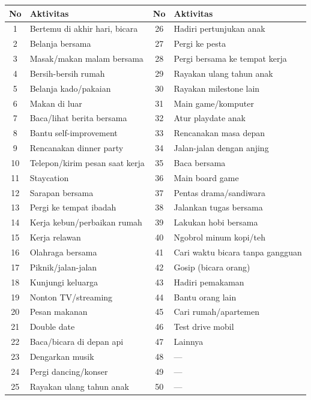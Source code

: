 \begin{center}
\small
\renewcommand{\arraystretch}{1.2}
\begin{tabular}{|c|l|c|l|}
\hline
\rowcolor{primary!20}
\textbf{No} & \textbf{Aktivitas} & \textbf{No} & \textbf{Aktivitas} \\
\hline
1 & Bertemu di akhir hari, bicara & 26 & Hadiri pertunjukan anak \\
\hline
2 & Belanja bersama & 27 & Pergi ke pesta \\
\hline
3 & Masak/makan malam bersama & 28 & Pergi bersama ke tempat kerja \\
\hline
4 & Bersih-bersih rumah & 29 & Rayakan ulang tahun anak \\
\hline
5 & Belanja kado/pakaian & 30 & Rayakan milestone lain \\
\hline
6 & Makan di luar & 31 & Main game/komputer \\
\hline
7 & Baca/lihat berita bersama & 32 & Atur playdate anak \\
\hline
8 & Bantu self-improvement & 33 & Rencanakan masa depan \\
\hline
9 & Rencanakan dinner party & 34 & Jalan-jalan dengan anjing \\
\hline
10 & Telepon/kirim pesan saat kerja & 35 & Baca bersama \\
\hline
11 & Staycation & 36 & Main board game \\
\hline
12 & Sarapan bersama & 37 & Pentas drama/sandiwara \\
\hline
13 & Pergi ke tempat ibadah & 38 & Jalankan tugas bersama \\
\hline
14 & Kerja kebun/perbaikan rumah & 39 & Lakukan hobi bersama \\
\hline
15 & Kerja relawan & 40 & Ngobrol minum kopi/teh \\
\hline
16 & Olahraga bersama & 41 & Cari waktu bicara tanpa gangguan \\
\hline
17 & Piknik/jalan-jalan & 42 & Gosip (bicara orang) \\
\hline
18 & Kunjungi keluarga & 43 & Hadiri pemakaman \\
\hline
19 & Nonton TV/streaming & 44 & Bantu orang lain \\
\hline
20 & Pesan makanan & 45 & Cari rumah/apartemen \\
\hline
21 & Double date & 46 & Test drive mobil \\
\hline
22 & Baca/bicara di depan api & 47 & Lainnya \\
\hline
23 & Dengarkan musik & 48 & --- \\
\hline
24 & Pergi dancing/konser & 49 & --- \\
\hline
25 & Rayakan ulang tahun anak & 50 & --- \\
\hline
\end{tabular}
\end{center}


